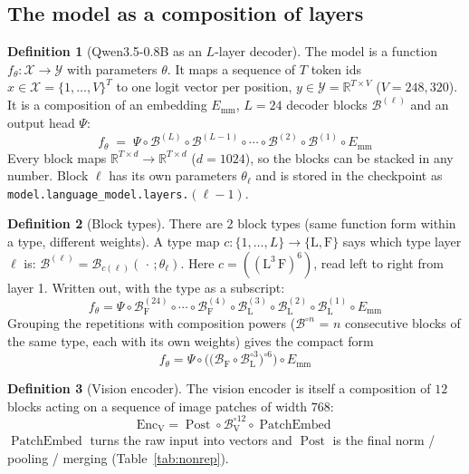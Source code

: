 \documentclass[10pt,a4paper]{article}
\newcommand{\op}[1]{\operatorname{#1}}
\theoremstyle{definition}
\newtheorem{definition}{Definition}[section]
\begin{document}
\subsection{The model as a composition of layers}\label{sec:comp}
\begin{definition}[Qwen3.5-0.8B as an $L$-layer decoder]
The model is a function $f_\theta:\mathcal{X}\to\mathcal{Y}$ with parameters $\theta$. It maps a sequence of $T$ token ids $x\in\mathcal{X}=\{1,\dots,V\}^{T}$ to one logit vector per position, $y\in\mathcal{Y}=\mathbb{R}^{T\times V}$ ($V=248{,}320$). It is a composition of an embedding $E_{\mathrm{mm}}$, $L=24$ decoder blocks $\mathcal{B}^{(\ell)}$ and an output head $\Psi$:
\begin{equation}
  f_\theta \;=\; \Psi\circ\mathcal{B}^{(L)}\circ\mathcal{B}^{(L-1)}\circ\cdots\circ\mathcal{B}^{(2)}\circ\mathcal{B}^{(1)}\circ E_{\mathrm{mm}}
\end{equation}
Every block maps $\mathbb{R}^{T\times d}\to\mathbb{R}^{T\times d}$ ($d=1024$), so the blocks can be stacked in any number. Block $\ell$ has its own parameters $\theta_\ell$ and is stored in the checkpoint as \texttt{model.language\_model.layers.}$(\ell-1)$.
\end{definition}
\begin{definition}[Block types]
There are 2 block types (same function form within a type, different weights). A type map $c:\{1,\dots,L\}\to\{\mathrm{L},\mathrm{F}\}$ says which type layer $\ell$ is: $\mathcal{B}^{(\ell)}=\mathcal{B}_{c(\ell)}(\,\cdot\,;\theta_\ell)$. Here $c=((\mathrm{L}^{3}\,\mathrm{F})^{6})$, read left to right from layer 1.
Written out, with the type as a subscript:
\begin{equation}
  f_\theta = \Psi\circ \mathcal{B}^{(24)}_{\mathrm{F}}\circ \cdots\circ \mathcal{B}^{(4)}_{\mathrm{F}}\circ \mathcal{B}^{(3)}_{\mathrm{L}}\circ \mathcal{B}^{(2)}_{\mathrm{L}}\circ \mathcal{B}^{(1)}_{\mathrm{L}}\circ E_{\mathrm{mm}}
\end{equation}
Grouping the repetitions with composition powers ($\mathcal{B}^{\circ n}$ = $n$ consecutive blocks of the same type, each with its own weights) gives the compact form
\begin{equation}\label{eq:compact}
  f_\theta = \Psi\circ\Big(\big(\mathcal{B}_{\mathrm{F}} \circ \mathcal{B}_{\mathrm{L}}^{\circ 3}\big)^{\circ 6}\Big)\circ E_{\mathrm{mm}}
\end{equation}
\end{definition}
\begin{definition}[Vision encoder]
The vision encoder is itself a composition of $12$ blocks acting on a sequence of image patches of width $768$:
\begin{equation}
  \op{Enc_V} = \op{Post}\circ \mathcal{B}_{\mathrm{V}}^{\circ 12}\circ\op{PatchEmbed}
\end{equation}
$\op{PatchEmbed}$ turns the raw input into vectors and $\op{Post}$ is the final norm / pooling / merging (Table~\ref{tab:nonrep}).
\end{definition}
\end{document}
